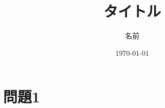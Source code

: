 \documentclass[a4j]{ujarticle}
\title{タイトル}
\author{名前}
\date{\today}
\author{}
\begin{document}
\maketitle
\section{問題1}
\end{document}
